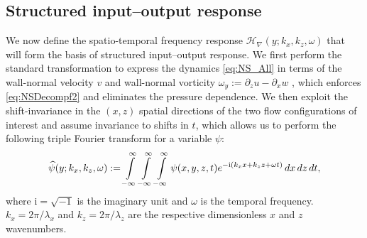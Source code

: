 \subsection{Structured input--output response}
\label{subsec:structured_uncertainty}

We now define the spatio-temporal frequency response $\mathcal{H_\nabla}(y;k_x,k_z,\omega)$ that will form the basis of  structured input--output response. We first perform the standard transformation to express the dynamics \eqref{eq:NS_All} in terms of the wall-normal velocity $v$ and wall-normal vorticity $\omega_y:=\partial_z u-\partial_x w$ \citep{schmid2012stability}, which enforces \eqref{eq:NSDecompf2} and eliminates the pressure dependence.  We then exploit the shift-invariance in the $(x,z)$ spatial directions of the two flow configurations of interest and assume invariance to shifts in $t$, which allows us to perform the following triple Fourier transform for a variable $\psi$:
\begin{equation}
\widehat{\psi}(y;k_x,k_z,\omega):=\int\limits_{-\infty}^{\infty} \int\limits_{-\infty}^{\infty}\int\limits_{-\infty}^{\infty}\psi(x,y,z,t)e^{-\text{i}(k_x x + k_z z+\omega t )}{\color{black}\,dx\,dz\,dt}, \label{eq:def_fourier_xz}
\end{equation}
where $\text{i}=\sqrt{-1}$ is the imaginary unit and $\omega$ is the temporal frequency.  $k_x = 2\pi/\lambda_x$ and $k_z = 2\pi/\lambda_z$ are the respective dimensionless $x$ and $z$ wavenumbers. 




